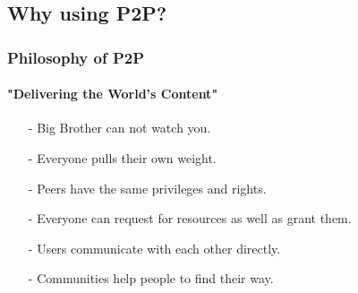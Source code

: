   \subsection{Why using P2P?}
    \begin{frame}
      \frametitle{Philosophy of P2P}
      \framesubtitle{"Delivering the World's Content"}
      \begin{enumerate}
      \item[-] Big Brother can not watch you.
      \item[-] Everyone pulls their own weight.
      \item[-] Peers have the same privileges and rights.
      \item[-] Everyone can request for resources as well as grant them.
      \item[-] Users communicate with each other directly.
      \item[-] Communities help people to find their way.
      \end{enumerate}
    \end{frame}
    
